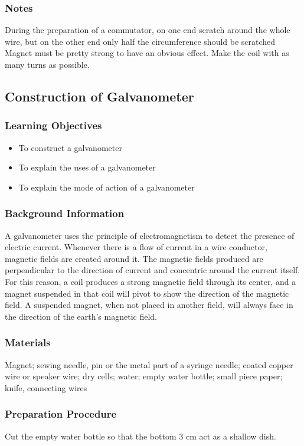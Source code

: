 \subsubsection*{Notes}
During the preparation of a commutator, on one end scratch around the whole wire, but on the other end only half the circumference should be scratched
Magnet must be pretty strong to have an obvious effect. Make the coil with as many turns as possible.  

\subsection{Construction of Galvanometer}

\subsubsection*{Learning Objectives}
\begin{itemize}
\item{To construct a galvanometer}
\item{To explain the uses of a galvanometer}
\item{To explain the mode of action of a galvanometer}
\end{itemize}

\subsubsection*{Background Information}
A galvanometer uses the principle of electromagnetism to detect the presence of electric current. Whenever there is a flow of current in a wire conductor, magnetic fields are created around it. The magnetic fields produced are perpendicular to the direction of current and concentric around the current itself. For this reason, a coil produces a strong magnetic field through its center, and a magnet suspended in that coil will pivot to show the direction of the magnetic field. A suspended magnet, when not placed in another field, will always face in the direction of the earth's magnetic field.  

\subsubsection*{Materials}
Magnet; sewing needle, pin or the metal part of a syringe needle; coated copper wire or speaker wire; dry cells; water; empty water bottle; small piece paper; knife, connecting wires

\subsubsection*{Preparation Procedure}
Cut the empty water bottle so that the bottom 3 cm act as a shallow dish.


